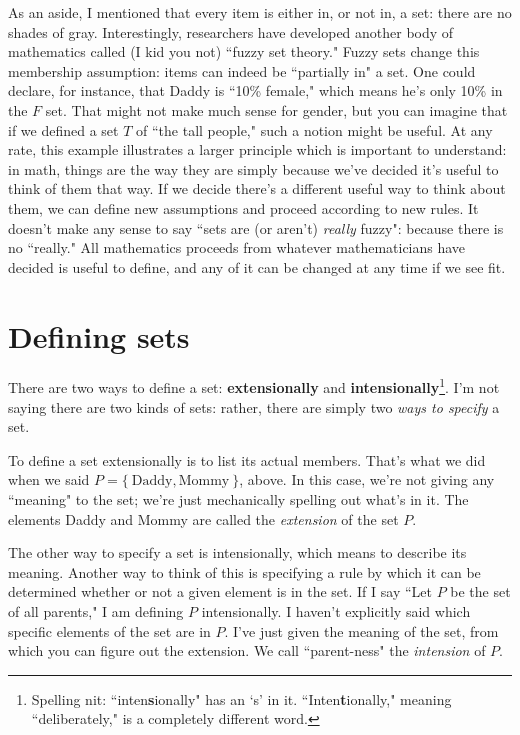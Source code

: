As an aside, I mentioned that every item is either in, or not in, a set:
there are no shades of gray. Interestingly, researchers have developed
another body of mathematics called (I kid you not) ``fuzzy set theory."
 Fuzzy sets change this membership assumption: items can
indeed be ``partially in" a set. One could declare, for instance, that
Daddy is ``10\% female," which means he's only 10\% in the $F$ set. That
might not make much sense for gender, but you can imagine that if we
defined a set $T$ of ``the tall people," such a notion might be useful. At
any rate, this example illustrates a larger principle which is important to
understand: in math, things are the way they are simply because we've
decided it's useful to think of them that way. If we decide there's a
different useful way to think about them, we can define new assumptions and
proceed according to new rules. It doesn't make any sense to say ``sets are
(or aren't) \textit{really} fuzzy": because there is no ``really." All
mathematics proceeds from whatever mathematicians have decided is useful to
define, and any of it can be changed at any time if we see fit.

\section{Defining sets}

There are two ways to define a set: \textbf{extensionally} and
\textbf{intensionally}\footnote{Spelling nit: ``inten\textbf{s}ionally" has
an `s' in it. ``Inten\textbf{t}ionally," meaning ``deliberately," is a
completely different word.}. I'm not saying there are two kinds of sets:
rather, there are simply two \textit{ways to specify} a set.

To define a set extensionally is to list its actual members. That's what we
did when we said $P = \{~\text{Daddy}, \text{Mommy}~\}$, above. In this
case, we're not giving any ``meaning" to the set; we're just mechanically
spelling out what's in it. The elements Daddy and Mommy are called the
\textit{extension}  of the set $P$.

The other way to specify a set is intensionally, which means to describe
its meaning. Another way to think of this is specifying a rule by which it
can be determined whether or not a given element is in the set. If I say
``Let $P$ be the set of all parents," I am defining $P$ intensionally. I
haven't explicitly said which specific elements of the set are in $P$. I've
just given the meaning of the set, from which you can figure out the
extension. We call ``parent-ness" the \textit{intension} 
of $P$.

